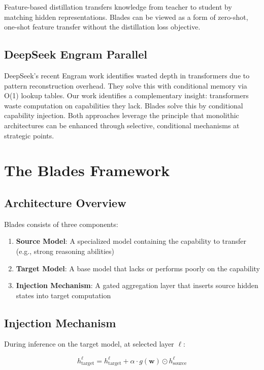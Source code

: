\documentclass[11pt,a4paper]{article}
\begin{document}
Feature-based distillation \cite{romero2014fitnets} transfers knowledge from teacher to student by matching hidden representations. Blades can be viewed as a form of zero-shot, one-shot feature transfer without the distillation loss objective.

\subsection{DeepSeek Engram Parallel}

DeepSeek's recent Engram work \cite{deepseek2025engram} identifies wasted depth in transformers due to pattern reconstruction overhead. They solve this with conditional memory via O(1) lookup tables. Our work identifies a complementary insight: transformers waste computation on capabilities they lack. Blades solve this by conditional capability injection. Both approaches leverage the principle that monolithic architectures can be enhanced through selective, conditional mechanisms at strategic points.

\section{The Blades Framework}

\subsection{Architecture Overview}

Blades consists of three components:

\begin{enumerate}
    \item \textbf{Source Model}: A specialized model containing the capability to transfer (e.g., strong reasoning abilities)
    \item \textbf{Target Model}: A base model that lacks or performs poorly on the capability
    \item \textbf{Injection Mechanism}: A gated aggregation layer that inserts source hidden states into target computation
\end{enumerate}

\subsection{Injection Mechanism}

During inference on the target model, at selected layer $\ell$:

\begin{equation}
h_{\text{target}}^{\ell} = h_{\text{target}}^{\ell} + \alpha \cdot g(\mathbf{w}) \odot h_{\text{source}}^{\ell}
\end{equation}
\end{document}

